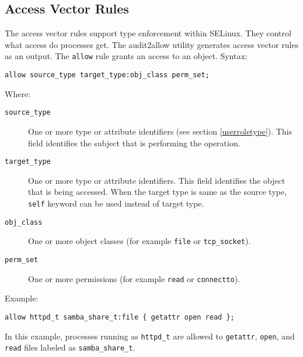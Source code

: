 \subsection{Access Vector Rules}
\label{avrules}
The access vector rules support type enforcement within SELinux. They control
what access do processes get. The audit2allow utility generates access vector
rules as an output. The \texttt{allow} rule grants an access to an object.
Syntax:
\begin{lstlisting}[language=te]
allow source_type target_type:obj_class perm_set;
\end{lstlisting}
Where:
\begin{description}
    \item [\texttt{source\_type}] One or more type or attribute identifiers (see
        section \ref{userroletype}). This field identifies the subject that is
        performing the operation.
    \item [\texttt{target\_type}] One or more type or attribute identifiers.
        This field identifies the object that is being accessed. When the
        target type is same as the source type, \texttt{self} keyword can be
        used instead of target type.
    \item [\texttt{obj\_class}] One or more object classes (for example
        \texttt{file} or \texttt{tcp\_socket}).
    \item [\texttt{perm\_set}] One or more permissions (for example
        \texttt{read} or \texttt{connectto}).
\end{description}
Example:
\begin{lstlisting}[language=te]
allow httpd_t samba_share_t:file { getattr open read };
\end{lstlisting}
In this example, processes running as \texttt{httpd\_t} are allowed to
\texttt{getattr}, \texttt{open}, and \texttt{read} files labeled as
\texttt{samba\_share\_t}.

